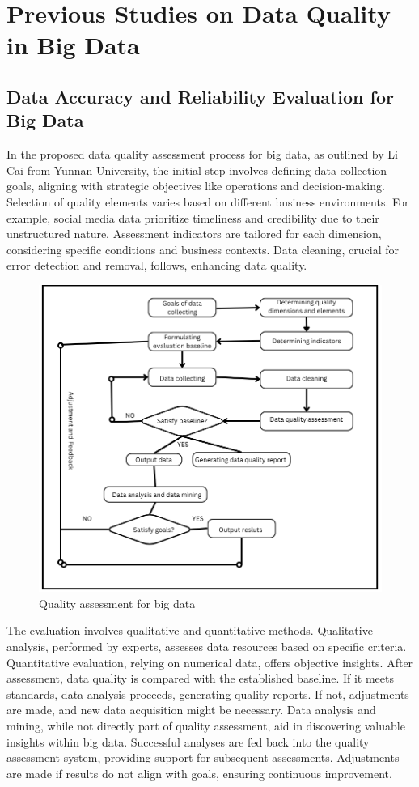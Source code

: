\documentclass[10pt,a4paper]{article}
\begin{document}
\section{Previous Studies on Data Quality in Big Data}
\subsection{Data Accuracy and Reliability Evaluation for Big Data}
In the proposed data quality assessment process for big data, as outlined by Li Cai from Yunnan University, the initial step involves defining data collection goals, aligning with strategic objectives like operations and decision-making. Selection of quality elements varies based on different business environments. For example, social media data prioritize timeliness and credibility due to their unstructured nature. Assessment indicators are tailored for each dimension, considering specific conditions and business contexts. Data cleaning, crucial for error detection and removal, follows, enhancing data quality.
\begin{figure}[htbp]
  \centering
  \includegraphics[width=0.8\columnwidth]{Quality assesment process for Big Data.png}
  \caption{Quality assessment for big data}
  \label{fig:quality-assessment}
\end{figure}
The evaluation involves qualitative and quantitative methods. Qualitative analysis, performed by experts, assesses data resources based on specific criteria. Quantitative evaluation, relying on numerical data, offers objective insights. After assessment, data quality is compared with the established baseline. If it meets standards, data analysis proceeds, generating quality reports. If not, adjustments are made, and new data acquisition might be necessary. Data analysis and mining, while not directly part of quality assessment, aid in discovering valuable insights within big data. Successful analyses are fed back into the quality assessment system, providing support for subsequent assessments. Adjustments are made if results do not align with goals, ensuring continuous improvement.\cite{article}
\end{document}
